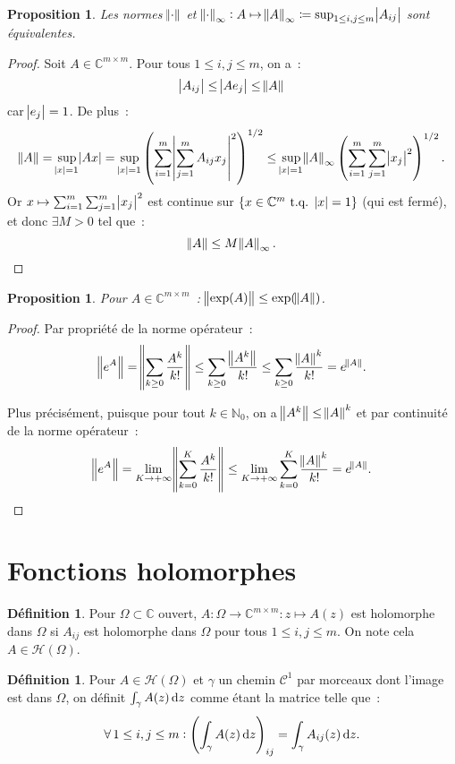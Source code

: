 \documentclass{report}
\newcommand{\C}{{\mathbb C}}
\newcommand{\N}{{\mathbb N}}
\newcommand{\tq}{\text{ t.q. }}
\newcommand{\st}{\tq}
\newcommand{\pinfty}{{+\infty}}
\newtheorem{prp}[thm]{Proposition}
\theoremstyle{definition}
\newtheorem{déf}[thm]{Définition}
\theoremstyle{remark}
\begin{document}
\begin{prp} Les normes $\norm \cdot$ et $\norm \cdot_\infty : A \mapsto \norm A_\infty \coloneqq \sup_{1 \leq i,j \leq m}\abs {A_{ij}}$ sont équivalentes.
\end{prp}

\begin{proof} Soit $A \in \C^{m \times m}$. Pour tous $1 \leq i, j \leq m$, on a~:
\[\abs {A_{ij}} \leq \abs {Ae_j} \leq \norm A\]
car $\abs {e_j} = 1$. De plus~:
\[\norm A = \sup_{\abs x = 1}\abs {Ax} = \sup_{\abs x = 1}\left(\sum_{i=1}^m\abs {\sum_{j=1}^mA_{ij}x_j}^2\right)^{1/2}
\leq \sup_{\abs x = 1}\norm A_\infty\left(\sum_{i=1}^m\sum_{j=1}^m\abs {x_j}^2\right)^{1/2}.\]
Or $x \mapsto \sum_{i=1}^m\sum_{j=1}^m\abs {x_j}^2$ est continue sur $\{x \in \C^m \st \abs x = 1\}$ (qui est fermé), et donc $\exists M > 0$ tel que~:
\[\norm A \leq M\norm A_\infty.\]
\end{proof}

\begin{prp} Pour $A \in \C^{m \times m}$~: $\norm {\exp(A)} \leq \exp(\norm A)$.
\end{prp}

\begin{proof} Par propriété de la norme opérateur~:
\[\norm {e^A} = \norm {\sum_{k \geq 0}\frac {A^k}{k!}} \leq \sum_{k \geq 0}\frac {\norm {A^k}}{k!} \leq \sum_{k \geq 0}\frac {\norm A^k}{k!} = e^{\norm A}.\]

Plus précisément, puisque pour tout $k \in \N_0$, on a $\norm {A^k} \leq \norm A^k$ et par continuité de la norme opérateur~:
\[\norm {e^A} = \lim_{K \to \pinfty}\norm {\sum_{k=0}^K\frac {A^k}{k!}} \leq \lim_{K \to \pinfty}\sum_{k=0}^K\frac {\norm A^k}{k!} = e^{\norm A}.\]
\end{proof}

\section{Fonctions holomorphes}
\begin{déf} Pour $\Omega \subset \C$ ouvert, $A : \Omega \to \C^{m \times m} : z \mapsto A(z)$ est holomorphe dans $\Omega$ si $A_{ij}$ est holomorphe dans $\Omega$
pour tous $1 \leq i, j \leq m$. On note cela $A \in \mathscr H(\Omega)$.
\end{déf}

\begin{déf} Pour $A \in \mathscr H(\Omega)$ et $\gamma$ un chemin $\mathcal C^1$ par morceaux dont l'image est dans $\Omega$, on définit $\int_\gamma A(z)\dif z$
comme étant la matrice telle que~:
\[\forall\, 1 \leq i, j \leq m : \left(\int_\gamma A(z)\dif z\right)_{ij} = \int_\gamma A_{ij}(z)\dif z.\]
\end{déf}
\end{document}

